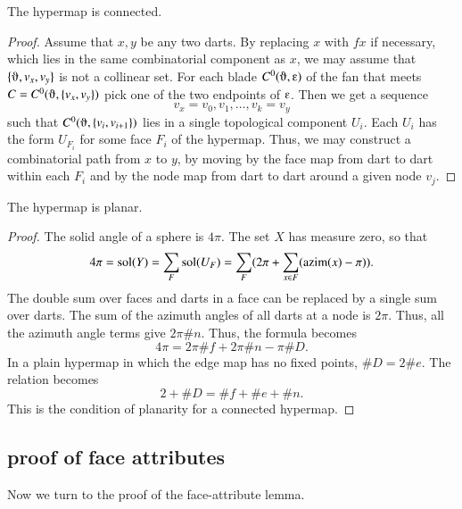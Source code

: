 \begin{corollary}  
The hypermap is connected.
\end{corollary}

\begin{proof} Assume that $x,y$ be any two darts.  By replacing $x$ with $f x$ if necessary, which lies in the same combinatorial component as $x$, we may
assume that $\{\orgn,v_x,v_y\}$ is not a collinear set. 
For each blade $C^0(\orgn,\e)$ of the fan that meets $C=C^0(\orgn,\{v_x,v_y\})$
pick one of the two endpoints of $\e$.  Then we get a sequence
$$
v_x=v_0,v_1,\ldots,v_k=v_y
$$
such that $C^0(\orgn,\{v_i,v_{i+1}\})$ lies in a single topological component $U_i$.  Each $U_i$ has the form $U_{F_i}$ for some face $F_i$ of the hypermap.
Thus, we may construct a combinatorial path from $x$ to $y$, by moving by the face map from dart to dart within each $F_i$ and by the node map from dart to dart around a given node $v_j$.
\end{proof}

\begin{corollary}  
The hypermap is planar.
\end{corollary}

\begin{proof}  The solid angle of a sphere is $4\pi$.  The set $X$
has measure zero, so that
$$
4\pi = \operatorname{sol}(Y)= \sum_F \operatorname{sol}(U_F) = 
\sum_F ( 2\pi + \sum_{x\in F} ({\operatorname{azim}}(x)-\pi) ).
$$
The double sum over faces and darts in a face can be replaced by
a single sum over darts.  
The sum of the azimuth angles of all darts at a node is $2\pi$. Thus,
all the azimuth angle terms give $2\pi\#n$.
Thus, the formula becomes
$$
4\pi = 2\pi \#f +2\pi\#n - \pi \#D.
$$
In a plain hypermap in which the edge map has no fixed points, $\#D = 2\#e$.
The relation becomes
$$
2 + \#D = \#f + \#e + \#n.
$$
This is the condition of planarity for a connected hypermap.
\end{proof}

\subsection{proof of face attributes}

Now we turn to the proof of the face-attribute lemma.

